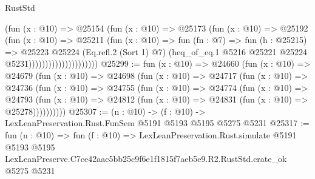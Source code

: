 \begin{lexlean}{RustStd}
\begin{coremodule}
                                  (fun (x : @10) =>
                                  @25154
                                    (fun (x : @10) =>
                                    @25173
                                      (fun (x : @10) =>
                                      @25192
                                        (fun (x : @10) =>
                                        @25211
                                          (fun (x : @10) =>
                                          fun (fn : @7) =>
                                          fun (h : @25215) =>
                                          @25223
                                            @25224
                                            (Eq.refl.{2} (Sort 1) @7)
                                            (heq_of_eq.{1}
                                              @5216
                                              @25221
                                              @25224
                                              @5231)))))))))))))))))))))
@25299 := fun (x : @10) =>
  @24660
    (fun (x : @10) =>
    @24679
      (fun (x : @10) =>
      @24698
        (fun (x : @10) =>
        @24717
          (fun (x : @10) =>
          @24736
            (fun (x : @10) =>
            @24755
              (fun (x : @10) =>
              @24774
                (fun (x : @10) =>
                @24793
                  (fun (x : @10) =>
                  @24812 (fun (x : @10) => @24831 (fun (x : @10) => @25278))))))))))
@25307 := (n : @10) -> (f : @10) -> LexLeanPreservation.Rust.FunSem @5191 @5193 @5195 @5275 @5231
@25317 := fun (n : @10) =>
  fun (f : @10) =>
  LexLeanPreservation.Rust.simulate
    @5191
    @5193
    @5195
    LexLeanPreserve.C7ce42aac5bb25c9f6e1f1815f7aeb5e9.R2.RustStd.crate_ok
    @5275
    @5231
\end{coremodule}
\end{lexlean}
